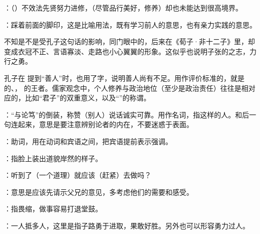 {
\begin{lyblobitemize}
\item {}：（）不效法先贤努力进修，（尽管品行美好，修养）却也未能达到很高境界。

：踩着前面的脚印，这是比喻用法，既有学习前人的意思，也有亲力实践的意思。

不知是不是受孔子这句话的影响，同门眼中的，后来在《荀子·非十二子》里，却变成衣冠不正、言语寡淡、走路也小心翼翼的形象。这似乎也说明子张的之志，力行之勇。
\end{lyblobitemize}
孔子在   提到“善人”时，也用了字，说明善人尚有不足。用作评价标准的，就是  的、， 的王者。儒家观念中，个人修养与政治地位（至少是政治责任）往往是相对应的，比如“君子”的双重意义，以及“”的称谓。
}
{}


{
\item {}：“与论笃”的倒装，称赞（别人）说话诚实可靠。用作名词，指这样的人。和后一句连起来，意思是要注意辨别论者的内在，不要迷惑于表面。

：助词，用在动词和宾语之间，把宾语提前表示强调。

\item {}：指脸上装出道貌岸然的样子。
}
{}


{
\item {}：听到了（一个道理）就应该（赶紧）去做吗？
\item {}：意思是应该先请示父兄的意见，多考虑他们的需要和感受。
\item {}：指畏缩，做事容易打退堂鼓。
\item {}：一人抵多人，这里是指子路勇于进取，果敢好胜。另外也可以形容勇力过人。
}
{}


